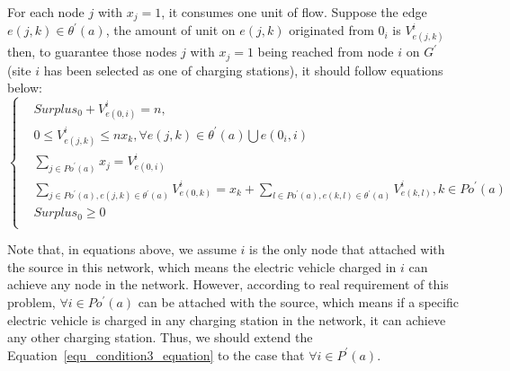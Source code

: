 For each node $j$ with $x_j = 1$, it consumes one unit of flow.
Suppose the edge $e(j,k) \in {\theta}^{'}(a)$,
the amount of unit on $e(j,k)$ originated from $0_i$ is $V^{i}_{e(j,k)}$
then, to guarantee those nodes $j$ with $x_j=1$ being reached from node $i$ on $G^{'}$ (site $i$ has been selected as one of charging stations),
it should follow equations below:
\begin{equation}
\label{equ_condition3_equation}
\left\{
\begin{aligned}
& Surplus_0+V^{i}_{e(0,i)} = n,     \\
& 0 \leqslant V^{i}_{e(j,k)} \leqslant nx_k, \forall e(j,k) \in {\theta}^{'}(a)\bigcup e(0_i, i)  \\
& \sum_{j \in {Po}^{'}(a)}x_j = V^{i}_{e(0,i)}\\
& \sum_{j \in {Po}^{'}(a), e(j,k) \in {\theta}^{'}(a)} V^{i}_{e(0,k)} = x_k + \sum_{l \in {Po}^{'}(a), e(k,l) \in {\theta}^{'}(a) } V^{i}_{e(k, l)}, k \in Po^{'}(a) \\
& Surplus_0 \geqslant 0\\
\end{aligned}
\right.
\end{equation}

Note that, in equations above,
we assume $i$ is the only node that attached with the source in this network, which means the electric vehicle charged in $i$ can achieve any node in the network.
However, according to real requirement of this problem, $\forall i \in Po^{'}(a)$ can be attached with the source,
which means if a specific electric vehicle is charged in any charging station in the network,
it can achieve any other charging station.
Thus, we should extend the Equation~\ref{equ_condition3_equation} to the case that $\forall i\in P^{'}(a)$.


